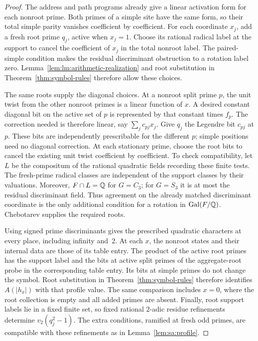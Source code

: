 \begin{proof}
The address and path programs already give a linear activation form
for each nonroot prime.  Both primes of a simple site have the same
form, so their total simple parity vanishes coefficient by coefficient.
For each coordinate $x_j$, add a fresh root prime $q_j$, active when
$x_j=1$.  Choose its rational radical label at the support to cancel
the coefficient of $x_j$ in the total nonroot label.  The paired-simple
condition makes the residual discriminant obstruction to a rotation
label zero.  Lemma~\ref{lem:lm:arithmetic-realization} and root
substitution in Theorem~\ref{thm:symbol-rules} therefore allow these
choices.

The same roots supply the diagonal choices.  At a nonroot split prime
$p$, the unit twist from the other nonroot primes is a linear function
of $x$.  A desired constant diagonal bit on the active set of $p$ is
represented by that constant times $f_p$.  The correction needed is
therefore linear, say $\sum_j c_{pj}x_j$.  Give $q_j$ the Legendre
bit $c_{pj}$ at $p$.  These bits are independently prescribable for
the different $p$; simple positions need no diagonal correction.
At each stationary prime, choose the root bits to cancel the existing
unit twist coefficient by coefficient.  To check compatibility, let $L$ be the compositum of the rational
quadratic fields recording these finite tests. The fresh-prime radical
classes are independent of the support classes by their valuations.
Moreover, $F\cap L=\mathbb Q$ for $G=C_3$; for $G=S_3$ it is at most
the residual discriminant field. Thus agreement on the already matched
discriminant coordinate is the only additional condition for a rotation
in $\operatorname{Gal}(F/\mathbb Q)$. Chebotarev supplies the required roots.

Using signed prime discriminants gives the prescribed quadratic
characters at every place, including infinity and~$2$. At each $x$,
the nonroot states and their internal data are those of its table entry.
The product of the active root primes has the support label and the
bits at active split primes of the aggregate-root probe in the
corresponding table entry. Its bits at simple primes do not change
the symbol. Root substitution in Theorem~\ref{thm:symbol-rules}
therefore identifies $A(|h_x|)$ with that profile value. The same
comparison includes $x=0$, where the root collection is empty and all
added primes are absent.  Finally, root support labels lie in a
fixed finite set, so fixed rational $2$-adic residue refinements
determine $v_2(q_j^2-1)$.  The extra conditions, ramified at fresh
odd primes, are compatible with these refinements as in
Lemma~\ref{lem:sa:profile}.
\end{proof}

